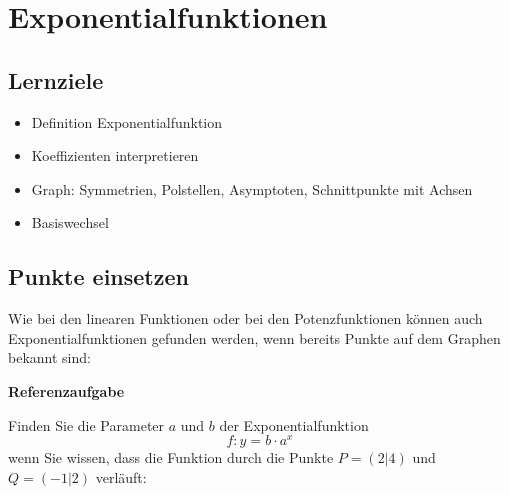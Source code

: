 
\section{Exponentialfunktionen}
\subsection*{Lernziele}

\begin{itemize}
\item Definition Exponentialfunktion
\item Koeffizienten interpretieren
\item Graph: Symmetrien, Polstellen, Asymptoten, Schnittpunkte mit
  Achsen
  \item Basiswechsel
\end{itemize}

\newpage

\subsection{Punkte einsetzen}
Wie bei den linearen Funktionen oder bei den Potenzfunktionen können auch Exponentialfunktionen gefunden werden, wenn bereits Punkte auf dem Graphen bekannt sind:

\textbf{Referenzaufgabe}

Finden Sie die Parameter $a$ und $b$ der Exponentialfunktion
$$f: y=b\cdot{}a^x$$
wenn Sie wissen, dass die Funktion durch die Punkte $P=(2|4)$ und $Q=(-1|2)$ verläuft:




